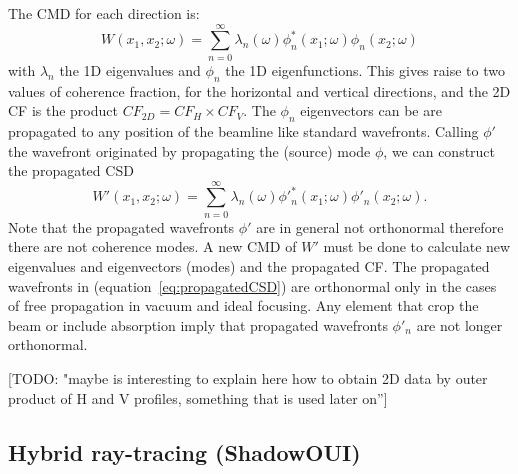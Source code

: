 \documentclass{iucr}              %
\newcommand{\todo}[1]{{\color{red}[TODO: "#1'']}}
\begin{document}
 The CMD for each direction is:
\begin{equation}
W(x_1,x_2;\omega) = \sum_{n=0}^{\infty} \lambda_n(\omega) \phi_n^*(x_1;\omega) \phi_n(x_2;\omega) 
\label{eq:CMD1D}
\end{equation}
with $\lambda_n$ the 1D eigenvalues and $\phi_n$ the 1D eigenfunctions. This gives raise to two values of coherence fraction, for the horizontal and vertical directions, and the 2D CF is the product $CF_{2D}=CF_H \times CF_V$. The $\phi_n$ eigenvectors can be are propagated to any position of the beamline like standard wavefronts. Calling $\phi'$ the wavefront originated by propagating the (source) mode $\phi$, we can construct the propagated CSD    
\begin{equation}
W'(x_1,x_2;\omega) = \sum_{n=0}^{\infty} \lambda_n(\omega) \phi'^{*}_n(x_1;\omega) \phi'_n(x_2;\omega).
\label{eq:propagatedCSD}
\end{equation}
Note that the propagated wavefronts $\phi'$ are in general not orthonormal therefore there are not coherence modes. A new CMD of $W'$ must be done to calculate new eigenvalues and eigenvectors (modes) and the propagated CF. The propagated wavefronts in (equation~\ref{eq:propagatedCSD}) are orthonormal only in the cases of free propagation in vacuum and ideal focusing. Any element that crop the beam or include absorption imply that propagated wavefronts $\phi'_n$ are not longer orthonormal. 

\todo{maybe is interesting to explain here how to obtain 2D data by outer product of H and V profiles, something that is used later on}

\subsection{Hybrid ray-tracing (ShadowOUI)}
\end{document}
